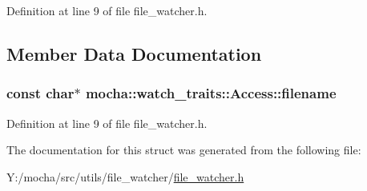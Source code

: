 Definition at line 9 of file file\_\-watcher.h.



\subsection{Member Data Documentation}
\hypertarget{structmocha_1_1watch__traits_1_1_access_a8206bd29bd1335cee1c19b72458e36d4}{
\subsubsection[{filename}]{\setlength{\rightskip}{0pt plus 5cm}const char$\ast$ {\bf mocha::watch\_\-traits::Access::filename}}}
\label{structmocha_1_1watch__traits_1_1_access_a8206bd29bd1335cee1c19b72458e36d4}


Definition at line 9 of file file\_\-watcher.h.



The documentation for this struct was generated from the following file:\begin{DoxyCompactItemize}
\item 
Y:/mocha/src/utils/file\_\-watcher/\hyperlink{file__watcher_8h}{file\_\-watcher.h}\end{DoxyCompactItemize}

